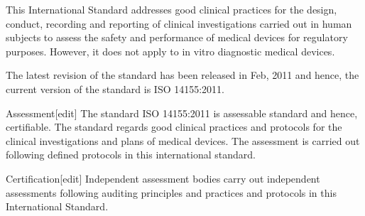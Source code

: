 This International Standard addresses good clinical practices for the design, conduct, recording and reporting of clinical investigations carried out in human subjects to assess the safety and performance of medical devices for regulatory purposes. However, it does not apply to in vitro diagnostic medical devices.

The latest revision of the standard has been released in Feb, 2011 and hence, the current version of the standard is ISO 14155:2011.

Assessment[edit]
The standard ISO 14155:2011 is assessable standard and hence, certifiable. The standard regards good clinical practices and protocols for the clinical investigations and plans of medical devices. The assessment is carried out following defined protocols in this international standard.

Certification[edit]
Independent assessment bodies carry out independent assessments following auditing principles and practices and protocols in this International Standard.
